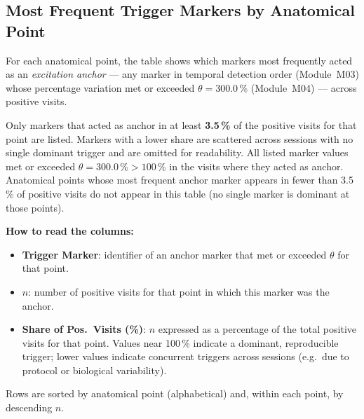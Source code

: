 \documentclass[a4paper,11pt]{article}
\begin{document}
\subsection{Most Frequent Trigger Markers by Anatomical Point}

For each anatomical point, the table shows which markers most frequently acted as an
\emph{excitation anchor} --- any marker in temporal detection order (Module~M03)
whose percentage variation met or exceeded $\theta = 300.0\,\%$
(Module~M04) --- across positive visits.

\medskip
Only markers that acted as anchor in at least \textbf{3.5\,\%}
of the positive visits for that point are listed.
Markers with a lower share are scattered across sessions with no single dominant trigger
and are omitted for readability.
All listed marker values met or exceeded $\theta = 300.0\,\% > 100\,\%$ in the
visits where they acted as anchor.
Anatomical points whose most frequent anchor marker appears in fewer than
3.5\,\% of positive visits do not appear in this table (no single
marker is dominant at those points).

\medskip
\noindent\textbf{How to read the columns:}
\begin{itemize}
  \item \textbf{Trigger Marker}: identifier of an anchor marker that met or exceeded $\theta$
        for that point.
  \item \textbf{$n$}: number of positive visits for that point in which this marker was
        the anchor.
  \item \textbf{Share of Pos.\ Visits (\%)}: $n$ expressed as a percentage of the total
        positive visits for that point.
        Values near 100\,\% indicate a dominant, reproducible trigger;
        lower values indicate concurrent triggers across sessions (e.g.\ due to
        protocol or biological variability).
\end{itemize}

\medskip
\noindent Rows are sorted by anatomical point (alphabetical) and, within each point, by
descending $n$.
\end{document}
